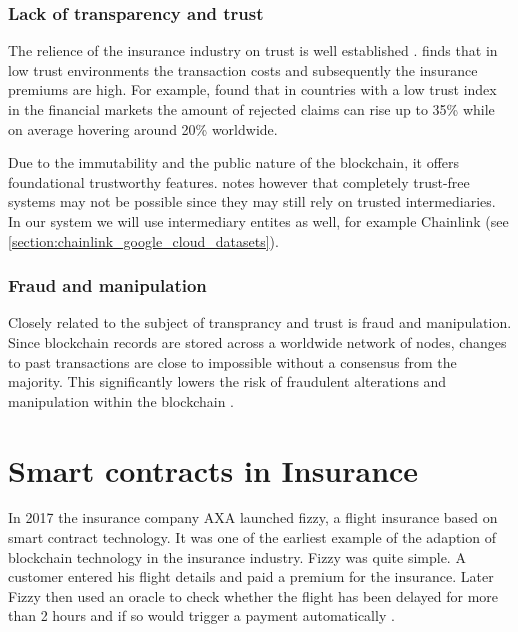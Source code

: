  \subsubsection{Lack of transparency and trust}
 
 The relience of the insurance industry on trust is well established \autocite{courbage2021trust}. \autocite{guiso2012trust} finds that in low trust environments the transaction costs and subsequently the insurance premiums are high. For example, \autocite{gennaioli2022trust} found that in countries with a low trust index in the financial markets the amount of rejected claims can rise up to 35\% while on average hovering around 20\% worldwide. 
 
 Due to the immutability and the public nature of the blockchain, it offers foundational trustworthy features. \autocite{hawlitschek2018limits} notes however that completely trust-free systems may not be possible since they may still rely on trusted intermediaries. In our system we will use intermediary entites as well, for example Chainlink (see \cref{section:chainlink_google_cloud_datasets}).
 
 \subsubsection{Fraud and manipulation}
 
 Closely related to the subject of transprancy and trust is fraud and manipulation. Since blockchain records are stored across a worldwide network of nodes, changes to past transactions are close to impossible without a consensus from the majority. This significantly lowers the risk of fraudulent alterations and manipulation within the blockchain \autocite{eigelshoven2021cryptocurrency}. 
 
 \section{Smart contracts in Insurance}\label{section:smart_contracts_insurance}
 
 In 2017 the insurance company AXA launched fizzy, a flight insurance based on smart contract technology. It was one of the earliest example of the adaption of blockchain technology in the insurance industry. Fizzy was quite simple. A customer entered his flight details and paid a premium for the insurance. Later Fizzy then used an oracle to check whether the flight has been delayed for more than 2 hours and if so would trigger a payment automatically \autocite{hoffmann2021double}.

